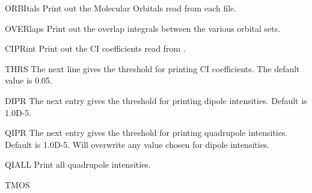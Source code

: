 \begin{keywordlist}
\item[ORBItals]
Print out the Molecular Orbitals read from each
 file.
\item[OVERlaps]
Print out the overlap integrals between the various orbital sets.
\item[CIPRint]
Print out the CI coefficients read from
.
\item[THRS]
The next line gives the threshold for printing CI coefficients. The
default value is 0.05.
\item[DIPR]
The next entry gives the threshold for printing dipole intensities.
Default is 1.0D-5.
\item[QIPR]
The next entry gives the threshold for printing quadrupole intensities.
Default is 1.0D-5.
Will overwrite any value chosen for dipole intensities.
\item[QIALL]
Print all quadrupole intensities.
\item[TMOS]

\end{keywordlist}
